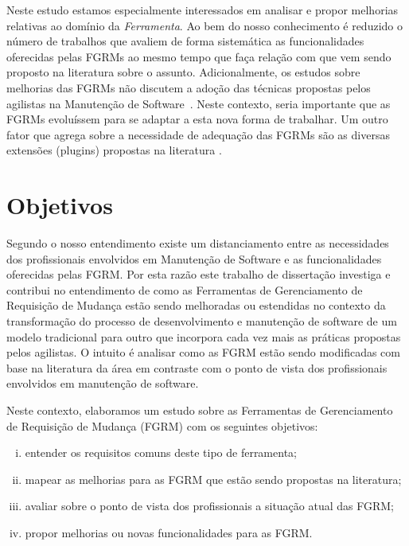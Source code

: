 Neste estudo estamos especialmente interessados em analisar e propor melhorias
relativas ao domínio da \textit{Ferramenta}. Ao bem do nosso conhecimento é
reduzido o número de trabalhos que avaliem de forma sistemática as
funcionalidades oferecidas pelas FGRMs ao mesmo tempo que faça relação com que
vem sendo proposto na li\-te\-ra\-tu\-ra sobre o assunto. Adicionalmente, os
estudos sobre melhorias das FGRMs não discutem a adoção das técnicas propostas
pelos agilistas na Manutenção de Software~\cite{Soltan2016,Devulapally2015,
    Heeager2015}. Neste contexto, seria importante que as FGRMs evoluíssem para
se adaptar a esta nova forma de trabalhar. Um outro fator que agrega sobre a
necessidade de adequação das FGRMs são as diversas extensões (plugins) propostas
na literatura
\cite{101186,Thung:2014:BIT:2635868.2661678,Kononenko:2014:DED:2591062.2591075}.

\section{Objetivos}
\label{sec:intro-objetivos}

Segundo o nosso entendimento existe um distanciamento entre as necessidades dos
profissionais envolvidos em Manutenção de Software e as funcionalidades
oferecidas pelas FGRM\@. Por esta razão este trabalho de dissertação investiga e
contribui no entendimento de como as Ferramentas de Gerenciamento de Requisição
de Mudança estão sendo melhoradas ou estendidas no contexto da transformação do
processo de desenvolvimento e manutenção de software de um modelo tradicional
para outro que incorpora cada vez mais as práticas propostas pelos agilistas. O
intuito é analisar como as FGRM estão sendo modificadas com base na literatura
da área em contraste com o ponto de vista dos profissionais envolvidos em
manutenção de software.

Neste contexto, elaboramos um estudo sobre as Ferramentas de Gerenciamento de
Requisição de Mudança (FGRM) com os seguintes objetivos:
\begin{enumerate}[(i)]
	\item entender os requisitos comuns deste tipo de ferramenta;
	\item mapear as melhorias para as FGRM que estão sendo propostas na
		literatura;
	\item avaliar sobre o ponto de vista dos profissionais a
		situação atual das FGRM\@;
	\item propor melhorias ou novas funcionalidades para as FGRM\@.
\end{enumerate}

